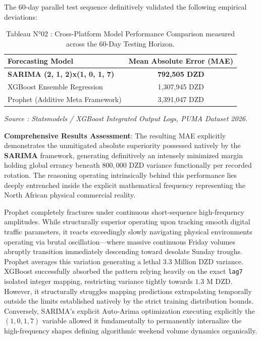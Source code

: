 \documentclass[12pt,a4paper]{report}
\begin{document}
The 60-day parallel test sequence definitively validated the following empirical deviations:
\begin{table}[H]
    \centering
    \begin{tabular}{lc}
    \toprule
    \textbf{Forecasting Model} & \textbf{Mean Absolute Error (MAE)} \\
    \midrule
    \textbf{SARIMA (2, 1, 2)x(1, 0, 1, 7)} & \textbf{792,505 DZD} \\
    XGBoost Ensemble Regression & 1,307,945 DZD \\
    Prophet (Additive Meta Framework) & 3,391,047 DZD \\
    \bottomrule
    \end{tabular}
    \caption{Tableau N°02 : Cross-Platform Model Performance Comparison measured across the 60-Day Testing Horizon.}
    \label{tab:mae_comparison}
\end{table}
\vspace{-0.5cm}
\begin{center}
    \footnotesize{\textit{Source : Statsmodels / XGBoost Integrated Output Logs, PUMA Dataset 2026.}}
\end{center}

\textbf{Comprehensive Results Assessment}: 
The resulting MAE explicitly demonstrates the unmitigated absolute superiority possessed natively by the \textbf{SARIMA} framework, generating definitively an intensely minimized margin holding global errancy beneath $800,000$ DZD variance functionally per recorded rotation. The reasoning operating intrinsically behind this performance lies deeply entrenched inside the explicit mathematical frequency representing the North African physical commercial reality. 

Prophet completely fractures under continuous short-sequence high-frequency amplitudes. While structurally superior operating upon tracking smooth digital traffic parameters, it reacts exceedingly slowly navigating physical environments operating via brutal oscillation—where massive continuous Friday volumes abruptly transition immediately descending toward desolate Sunday troughs. Prophet averages this variation generating a lethal $3.3$ Million DZD variance. XGBoost successfully absorbed the pattern relying heavily on the exact \texttt{lag7} isolated integer mapping, restricting variance tightly towards $1.3$ M DZD. However, it structurally struggles mapping predictions extrapolating temporally outside the limits established natively by the strict training distribution bounds. 
Conversely, SARIMA’s explicit Auto-Arima optimization executing explicitly the $(1,0,1,7)$ variable allowed it fundamentally to permanently internalize the high-frequency shapes defining algorithmic weekend volume dynamics organically.
\end{document}
